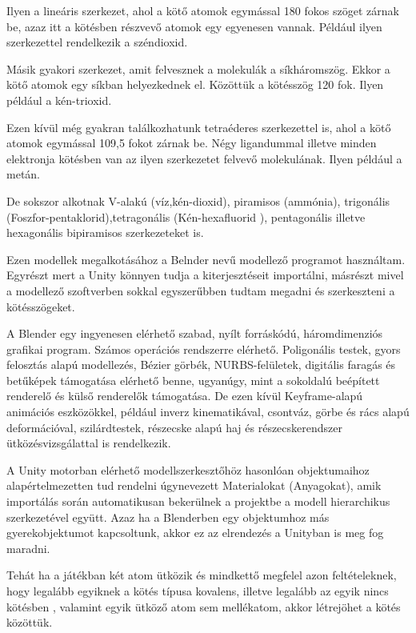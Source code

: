 \documentclass[colorlinks]{thesis-ekf}
\theoremstyle{definition}
\theoremstyle{remark}
\begin{document}
Ilyen a lineáris szerkezet, ahol a kötő atomok egymással 180 fokos szöget zárnak be, azaz itt a kötésben részvevő atomok egy egyenesen vannak. Például ilyen szerkezettel rendelkezik a széndioxid.

Másik gyakori szerkezet, amit felvesznek a molekulák a síkháromszög. Ekkor a kötő atomok egy síkban helyezkednek el. Közöttük a kötésszög 120 fok. Ilyen például a kén-trioxid.

Ezen kívül még gyakran találkozhatunk tetraéderes szerkezettel is, ahol a kötő atomok egymással 109,5 fokot zárnak be. Négy ligandummal illetve minden elektronja kötésben van az ilyen szerkezetet felvevő molekulának. Ilyen például a metán.

De sokszor alkotnak V-alakú (víz,kén-dioxid), piramisos (ammónia), trigonális (Foszfor-pentaklorid),tetragonális (Kén-hexafluorid ), pentagonális illetve hexagonális bipiramisos szerkezeteket is.

Ezen modellek megalkotásához a Belnder nevű modellező programot használtam. Egyrészt mert a Unity könnyen tudja a kiterjesztéseit importálni, másrészt mivel a modellező szoftverben sokkal egyszerűbben tudtam megadni és szerkeszteni a kötésszögeket.

A Blender egy ingyenesen elérhető  szabad, nyílt forráskódú, háromdimenziós grafikai program. Számos operációs rendszerre elérhető. Poligonális testek, gyors felosztás alapú modellezés, Bézier görbék, NURBS-felületek, digitális faragás és betűképek támogatása elérhető benne, ugyanúgy, mint a sokoldalú beépített renderelő és külső renderelők támogatása. De ezen kívül Keyframe-alapú animációs eszközökkel, például inverz kinematikával, csontváz, görbe és rács alapú deformációval, szilárdtestek, részecske alapú haj és részecskerendszer ütközésvizsgálattal is rendelkezik. \cite{blender}

A Unity motorban elérhető modellszerkesztőhöz hasonlóan objektumaihoz alapértelmezetten tud rendelni úgynevezett Materialokat (Anyagokat), amik importálás során automatikusan bekerülnek a projektbe a modell hierarchikus szerkezetével együtt. Azaz ha a Blenderben egy objektumhoz más gyerekobjektumot kapcsoltunk, akkor ez az elrendezés a Unityban is meg fog maradni. 

Tehát ha a játékban két atom ütközik és mindkettő megfelel azon feltételeknek, hogy legalább egyiknek a kötés típusa kovalens, illetve legalább az egyik nincs kötésben , valamint egyik ütköző atom sem mellékatom, akkor létrejöhet a kötés közöttük.
\end{document}
